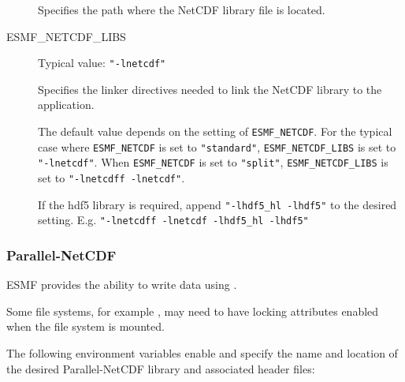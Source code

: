 \begin{description}
Specifies the path where the NetCDF library file is located.

\item[ESMF\_NETCDF\_LIBS] Typical value: {\tt "-lnetcdf"}

Specifies the linker directives needed to link the NetCDF library to
the application.

The default value depends on the setting of {\tt ESMF\_NETCDF}.  For the
typical case where {\tt ESMF\_NETCDF} is set to {\tt "standard"},
{\tt ESMF\_NETCDF\_LIBS} is set to {\tt "-lnetcdf"}.
When {\tt ESMF\_NETCDF} is set to {\tt "split"}, {\tt ESMF\_NETCDF\_LIBS}
is set to {\tt "-lnetcdff -lnetcdf"}.

If the hdf5 library is required, append {\tt "-lhdf5\_hl -lhdf5"} to the
desired setting.  E.g. {\tt "-lnetcdff -lnetcdf -lhdf5\_hl -lhdf5"}
\end{description}

\subsubsection{Parallel-NetCDF}
\label{sec:pnetcdf}
ESMF provides the ability to write data using
.

Some file systems, for example , may need
to have locking attributes enabled when the file system is mounted.

The following environment variables enable and specify the name and
location of the desired Parallel-NetCDF library and associated header files:

